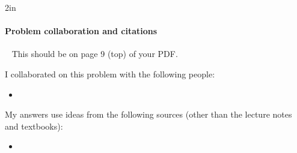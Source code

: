 \begin{answerBox}{2in}          %

  
  \paragraph{Problem  collaboration and citations}~\GradescopeComment
  {This should be on page 9 (top) of your PDF.}

  I collaborated on this problem with the following people:
  \begin{blue}
    \begin{itemize}
    \item \REPLACEME                    %
    \end{itemize}
  \end{blue}

  My answers use ideas from the following sources (other than the lecture notes and textbooks): 
  \begin{blue}
    \begin{itemize}
    \item \REPLACEME                    %
    \end{itemize}
  \end{blue}

\end{answerBox}

